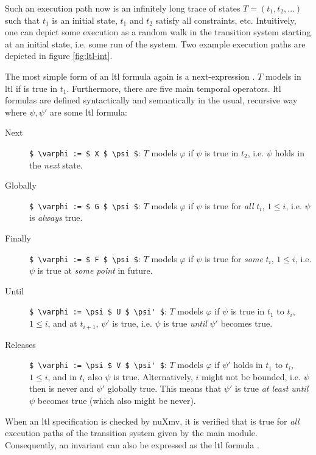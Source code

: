 Such an execution path now is an infinitely long trace of states $ T = (t_1, t_2, \dots) $ such that $ t_1 $ is an initial state, $ t_1 $ and $ t_2 $ satisfy all  constraints, etc.
Intuitively, one can depict some execution as a random walk in the transition system starting at an initial state, i.e. some run of the system.
Two example execution paths are depicted in figure \ref{fig:ltl-int}.

The most simple form of an \gls{ltl} formula again is a next-expression .
$ T $ models  in \gls{ltl} if  is true in $ t_1 $.
Furthermore, there are five main temporal operators.
\gls{ltl} formulas are defined syntactically and semantically in the usual, recursive way where $ \psi, \psi' $ are some \gls{ltl} formula:
\begin{description}
    \item[Next] \lstinline[language=smv,mathescape=true]{$ \varphi := $ X $ \psi $}: $ T $ models $ \varphi $ if $ \psi $ is true in $ t_2 $, i.e. $ \psi $ holds in the \textit{next} state.
    \item[Globally] \lstinline[language=smv,mathescape=true]{$ \varphi := $ G $ \psi $}: $ T $ models $ \varphi $ if $ \psi $ is true for \textit{all} $ t_i $, $ 1 \leq i $, i.e. $ \psi $ is \textit{always} true.
    \item[Finally] \lstinline[language=smv,mathescape=true]{$ \varphi := $ F $ \psi $}: $ T $ models $ \varphi $ if $ \psi $ is true for \textit{some} $ t_i $, $ 1 \leq i $, i.e. $ \psi $ is true at \textit{some point} in future.
    \item[Until] \lstinline[language=smv,mathescape=true]{$ \varphi := \psi $ U $ \psi' $}: $ T $ models $ \varphi $ if $ \psi $ is true in $ t_1 $ to $ t_i $, $ 1 \leq i $, and at $ t_{i + 1} $, $ \psi' $ is true, i.e. $ \psi $ is true \textit{until} $ \psi' $ becomes true.
    \item[Releases] \lstinline[language=smv,mathescape=true]{$ \varphi := \psi $ V $ \psi' $}: $ T $ models $ \varphi $ if $ \psi' $ holds in $ t_1 $ to $ t_i $, $ 1 \leq i $, and in $ t_i $ also $ \psi $ is true.
    Alternatively, $ i $ might not be bounded, i.e. $ \psi $ then is never and $ \psi' $ globally true.
    This means that $ \psi' $ is true \textit{at least until} $ \psi $ becomes true (which also might be never).
\end{description}

When an \gls{ltl} specification  is checked by nuXmv, it is verified that  is true for \textit{all} execution paths of the transition system given by the main module.
Consequently, an invariant  can also be expressed as the \gls{ltl} formula .

